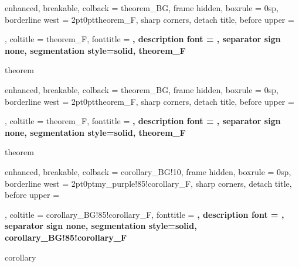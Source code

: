 


{
	enhanced,
	breakable,
	colback = theorem_BG,
	frame hidden,
	boxrule = 0sp,
	borderline west = {2pt}{0pt}{theorem_F},
	sharp corners,
	detach title,
	before upper = \tcbtitle\par\smallskip,
	coltitle = theorem_F,
	fonttitle = \bfseries\sffamily,
	description font = \mdseries,
	separator sign none,
	segmentation style={solid, theorem_F}
}
{theorem}

{
	enhanced,
	breakable,
	colback = theorem_BG,
	frame hidden,
	boxrule = 0sp,
	borderline west = {2pt}{0pt}{theorem_F},
	sharp corners,
	detach title,
	before upper = \tcbtitle\par\smallskip,
	coltitle = theorem_F,
	fonttitle = \bfseries\sffamily,
	description font = \mdseries,
	separator sign none,
	segmentation style={solid, theorem_F}
}
{theorem}

{
	enhanced,
	breakable,
	colback = corollary_BG!10,
	frame hidden,
	boxrule = 0sp,
	borderline west = {2pt}{0pt}{my_purple!85!corollary_F},
	sharp corners,
	detach title,
	before upper = \tcbtitle\par\smallskip,
	coltitle = corollary_BG!85!corollary_F,
	fonttitle = \bfseries\sffamily,
	description font = \mdseries,
	separator sign none,
	segmentation style={solid, corollary_BG!85!corollary_F}
}
{corollary}

